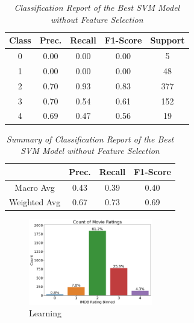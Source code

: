 \documentclass[11pt]{article}
\begin{document}
\begin{table}[!ht]
    \begin{center}
        \begin{tabular}{c|c|c|c|c}			
            \hline
            Class & Prec. & Recall & F1-Score & Support \\
            \hline\hline
            0 & 0.00 & 0.00 & 0.00 & 5 \\
            1 & 0.00 & 0.00 & 0.00 & 48 \\
            2 & 0.70 & 0.93 & 0.83 & 377 \\
            3 & 0.70 & 0.54 & 0.61 & 152 \\
            4 & 0.69 & 0.47 & 0.56 & 19\\
                \hline
        \end{tabular}

        \caption{\textit{Classification Report of the Best SVM Model without Feature Selection}}
        \label{svm-ft-report}
    \end{center}
\end{table}

\begin{table}[!ht]
    \begin{center}
        \begin{tabular}{c||c|c|c}			
            \hline
             & Prec. & Recall & F1-Score \\
            \hline\hline
            Macro Avg & 0.43 & 0.39 & 0.40 \\
            Weighted Avg & 0.67 & 0.73 & 0.69 \\
                \hline
        \end{tabular}

        \caption{\textit{Summary of Classification Report of the Best SVM Model without Feature Selection}}
        \label{svm-ft-report-sum}

    \end{center}
\end{table}

\begin{figure}[!ht]
	\centering
	\includegraphics[width = 0.48\textwidth]{res/class-dist.png}
	\caption{Learning }
	\label{fig:svm-lc-ft}
\end{figure}
\end{document}
